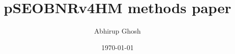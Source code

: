 \documentclass[twocolumn]{revtex4-1}
\begin{document}
\title{pSEOBNRv4HM methods paper}

\author{Abhirup Ghosh}



\date{\today}

\maketitle








\end{document}
